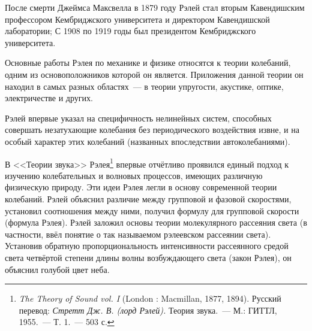 После смерти Джеймса Максвелла в 1879 году Рэлей стал вторым Кавендишским профессором Кембриджского университета и директором Кавендишской лаборатории; С 1908 по 1919 годы был президентом Кембриджского университета.

Основные работы Рэлея по механике и физике относятся к теории колебаний, одним из основоположников которой он является. Приложения данной теории он находил в самых разных областях~--- в теории упругости, акустике, оптике, электричестве и других.

Рэлей впервые указал на специфичность нелинейных систем, способных совершать незатухающие колебания без периодического воздействия извне, и на особый характер этих колебаний (названных впоследствии автоколебаниями).

В <<Теории звука>> Рэлея\footnote{\textit{The Theory of Sound vol. I} (London : Macmillan, 1877, 1894). Русский перевод: \textit{Стретт Дж. В. (лорд Рэлей).} Теория звука.~--- М.: ГИТТЛ, 1955.~--- Т. 1.~--- 503 с.} впервые отчётливо проявился единый подход к изучению колебательных и волновых процессов, имеющих различную физическую природу. Эти идеи Рэлея легли в основу современной теории колебаний. Рэлей объяснил различие между групповой и фазовой скоростями, установил соотношения между ними, получил формулу для групповой скорости (формула Рэлея). Рэлей заложил основы теории молекулярного рассеяния света (в частности, ввёл понятие о так называемом рэлеевском рассеянии света). Установив обратную пропорциональность интенсивности рассеянного средой света четвёртой степени длины волны возбуждающего света (закон Рэлея), он объяснил голубой цвет неба.


